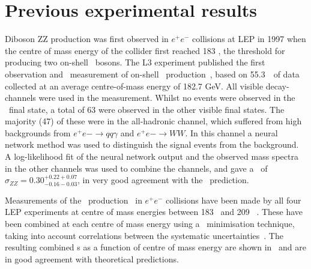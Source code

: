 
%
\section{Previous experimental results}
\label{sec:TheoryZZProduction-prevResults}

Diboson ZZ production was first observed in $e^+e^-$ collisions at LEP in 1997
when the centre of mass energy of the collider first reached 183 \gev, the
threshold for producing two on-shell \Z\ bosons.
The L3 experiment published the first observation and \cx\ measurement
of on-shell \ZZ\ production~\cite{Acciarri1999281}, based on 55.3~\ipb\
of data collected at an average centre-of-mass energy of 182.7 GeV. All visible
decay-channels were used in the measurement. Whilst no events were
observed in the \llll\ final state, a total of 63 were observed in
the other visible final states. The majority (47) of these were in the
all-hadronic channel, which suffered from high backgrounds from $e^+e-
\rightarrow qq \gamma$ and $e^+e- \rightarrow WW$. In this channel a neural
network method was used to distinguish the signal events from the background. A
log-likelihood fit of the neural network output and the observed mass spectra in
the other channels was used to combine the channels, and gave a \cx\ of
$\sigma_{ZZ} = 0.30^{+0.22 +0.07}_{-0.16 -0.03}$, in very good agreement with
the \sm\ prediction. 

Measurements of the \ZZ\ production \cx\ in $e^+e^-$ collisions have
been made by all four LEP experiments at centre of mass energies between 183
\gev\ and 209
\gev~\cite{Abbiendi:2003va,Abdallah:2003dv,Acciarri:1999ug,Schael:1166743}.
These have been combined at each centre of mass energy using a \chisquared\
minimisation technique, taking into account correlations between the systematic
uncertainties~\cite{bib:LEPEW2006}. The resulting combined \cx s as a
function of centre of mass energy are shown in~\fig{lep-cx} and are in good agreement with
theoretical predictions.


